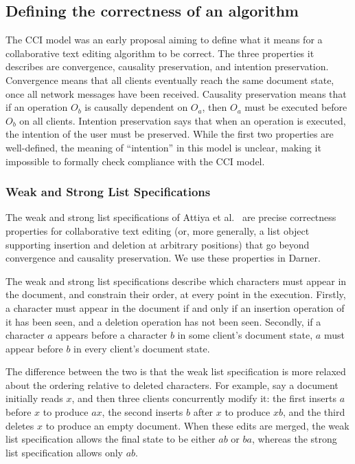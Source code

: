 \documentclass[sigplan,10pt,review,anonymous]{acmart}
\begin{document}
\subsection{Defining the correctness of an algorithm}

The CCI model \cite{Sun1996} was an early proposal aiming to define what it means for a collaborative text editing algorithm to be correct.
The three properties it describes are convergence, causality preservation, and intention preservation. Convergence means that all clients eventually reach the same document state, once all network messages have been received. Causality preservation means that if 
an operation $O_b$ is causally dependent on $O_a$, then $O_a$ must be executed before $O_b$ on all clients. Intention preservation says that when an operation is executed, the intention
of the user must be preserved.
While the first two properties are well-defined, the meaning of ``intention'' in this model is unclear, making it impossible to formally check compliance with the CCI model.

\subsubsection{Weak and Strong List Specifications}

The weak and strong list specifications of Attiya et al.~\cite{Attiya2016} are precise correctness properties for collaborative text editing (or, more generally, a list object supporting insertion and deletion at arbitrary positions) that go beyond convergence and causality preservation.
We use these properties in Darner.

The weak and strong list specifications describe which characters must appear in the document, and constrain their order, at every point in the execution.
Firstly, a character must appear in the document if and only if an insertion operation
of it has been seen, and a deletion operation has not been seen. Secondly, if a character $a$ appears before a character $b$ in some client's document state, $a$ must appear before $b$ in every client's document
state.

The difference between the two is that the weak list specification is more relaxed about the ordering relative to deleted characters.
For example, say a document initially reads $x$, and then three clients concurrently modify it: the first inserts $a$ before $x$ to produce $ax$, the second inserts $b$ after $x$ to produce $xb$, and the third deletes $x$ to produce an empty document.
When these edits are merged, the weak list specification allows the final state to be either $ab$ or $ba$, whereas the strong list specification allows only $ab$.
\end{document}
